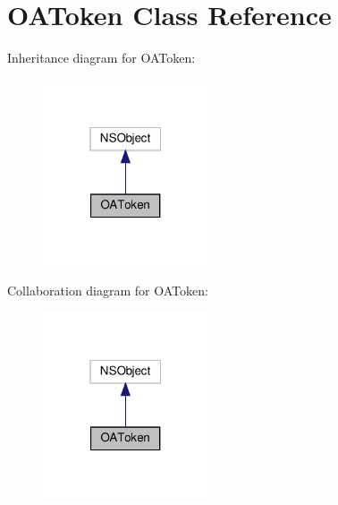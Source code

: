\hypertarget{interfaceOAToken}{}\section{O\+A\+Token Class Reference}
\label{interfaceOAToken}


Inheritance diagram for O\+A\+Token\+:
\nopagebreak
\begin{figure}[H]
\begin{center}
\leavevmode
\includegraphics[width=139pt]{interfaceOAToken__inherit__graph}
\end{center}
\end{figure}


Collaboration diagram for O\+A\+Token\+:
\nopagebreak
\begin{figure}[H]
\begin{center}
\leavevmode
\includegraphics[width=139pt]{interfaceOAToken__coll__graph}
\end{center}
\end{figure}
